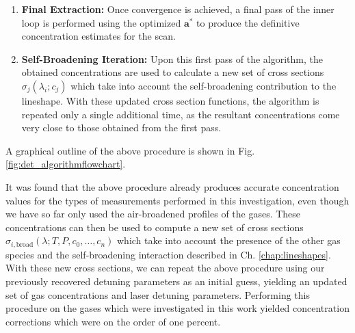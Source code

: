\documentclass[8pt,a4paper]{report}
\begin{document}
\begin{enumerate}
		\item \textbf{Final Extraction:} 
		Once convergence is achieved, a final pass of the inner loop is performed using the optimized $\mathbf{a}^*$ to produce the definitive concentration estimates for the scan.
		
		\item \textbf{Self-Broadening Iteration:} Upon this first pass of the algorithm, the obtained concentrations are used to calculate a new set of cross sections $\sigma_j(\lambda_i; c_j)$ which take into account the self-broadening contribution to the lineshape. With these updated cross section functions, the algorithm is repeated only a single additional time, as the resultant concentrations come very close to those obtained from the first pass.
	\end{enumerate}
	
	A graphical outline of the above procedure is shown in Fig. \ref{fig:det_algorithmflowchart}.
	
	It was found that the above procedure already produces accurate concentration values for the types of measurements performed in this investigation, even though we have so far only used the air-broadened profiles of the gases. These concentrations can then be used to compute a new set of cross sections $\sigma_{i,\mathrm{broad}}(\lambda; T, P, c_0, \ldots, c_n)$ which take into account the presence of the other gas species and the self-broadening interaction described in Ch. \ref{chap:lineshapes}. With these new cross sections, we can repeat the above procedure using our previously recovered detuning parameters as an initial guess, yielding an updated set of gas concentrations and laser detuning parameters. Performing this procedure on the gases which were investigated in this work yielded concentration corrections which were on the order of one percent.
	
\end{document}
